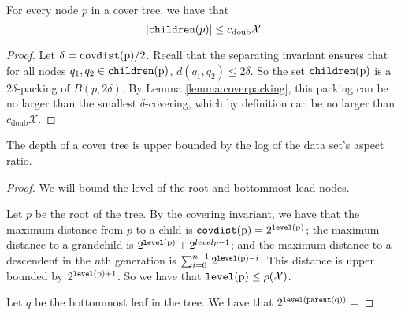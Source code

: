 \documentclass[../main.tex]{subfiles}
\newcommand{\set}[1]{\mathcal {#1}}
\newcommand{\dist}[2]{\distf({#1},{#2})}
\newcommand{\distf}{d}
\newcommand{\diam}[1]{\rho({#1})}
\newcommand{\doubnum}{c_\text{doub}}
\newcommand{\p}{\ensuremath p}
\newcommand{\level}[1]{\ensuremath{\textup{\text{\ttfamily level}({#1})}}}
\newcommand{\parent}[1]{\ensuremath{\textup{\text{\ttfamily parent}({#1})}}}
\newcommand{\children}[1]{\ensuremath{\textup{\text{\ttfamily children}({#1})}}}
\newcommand{\covdist}[1]{\ensuremath{\textup{\text{\ttfamily covdist}({#1})}}}
\begin{document}
\begin{lemma}
    For every node $p$ in a cover tree, we have that
    \begin{equation}
        |\children\p| \le \doubnum \set X
        .
    \end{equation}
\end{lemma}

\begin{proof}
    Let $\delta=\covdist p/2$.
    Recall that the separating invariant ensures that for all nodes $q_1,q_2\in\children p$,
    $\dist{q_1}{q_2}\le2\delta$.
    So the set \children p is a $2\delta$-packing of $B(p,2\delta)$.
    By Lemma \ref{lemma:coverpacking}, this packing can be no larger than the smallest $\delta$-covering,
    which by definition can be no larger than $\doubnum \set X$.
\end{proof}

\begin{lemma}
    The depth of a cover tree is upper bounded by the log of the data set's aspect ratio.
\end{lemma}

\begin{proof}
    We will bound the level of the root and bottommost lead nodes.

    Let $p$ be the root of the tree.
    By the covering invariant, we have that the maximum distance from $p$ to a child is $\covdist{p}=2^\level p$; 
    the maximum distance to a grandchild is $2^\level p + 2^{level p-1}$;
    and the maximum distance to a descendent in the $n$th generation is $\sum_{i=0}^{n-1} 2^{\level p-i}$.
    This distance is upper bounded by $2^{\level p+1}$.
    So we have that $\level{p}\le\diam{\set X}$.

    Let $q$ be the bottommost leaf in the tree.
    We have that $2^\level{\parent{q}} = $
\end{proof}
\end{document}
